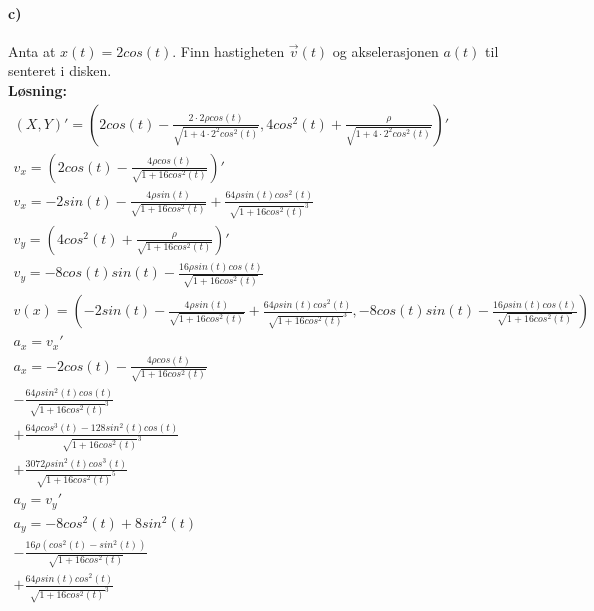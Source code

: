 \documentclass[11pt, A4paper,norsk]{article}
\begin{document}
		\paragraph{c)}
			\begin{flushleft}
Anta at $x(t) = 2 cos(t)$. Finn hastigheten $\vec{v}(t)$ og akselerasjonen $a(t)$ til senteret i disken. \\
\vspace{1mm}
\clearpage
\textbf{Løsning:} \\
\vspace{1mm}
				\begin{align}
(X, Y)' = \left(2cos(t) - \frac{2 \cdot 2 \rho cos(t)}{\sqrt{1 + 4 \cdot 2^2 cos^2(t)}}, 4cos^2(t) + \frac{\rho}{\sqrt{1 + 4 \cdot 2^2 cos^2(t)}}\right)' \nonumber \\
v_x = \left(2cos(t) - \frac{4 \rho cos(t)}{\sqrt{1 + 16cos^2(t)}}\right)' \nonumber\\
v_x = -2sin(t) -  \frac{4 \rho sin(t)}{\sqrt{1 + 16cos^2(t)}} + \frac{64 \rho sin(t)cos^2(t)}{\sqrt{1 + 16cos^2(t)}^3}\nonumber \\
v_y = \left(4cos^2(t) + \frac{\rho}{\sqrt{1 + 16cos^2(t)}}\right)' \nonumber \\
v_y = -8cos(t)sin(t) - \frac{16 \rho sin(t)cos(t)}{\sqrt{1 + 16cos^2(t)}} \nonumber \\
v(x) = \left(-2sin(t) -  \frac{4 \rho sin(t)}{\sqrt{1 + 16cos^2(t)}} + \frac{64 \rho sin(t)cos^2(t)}{\sqrt{1 + 16cos^2(t)}^3}, -8cos(t)sin(t) - \frac{16 \rho sin(t)cos(t)}{\sqrt{1 + 16cos^2(t)}}\right) \nonumber \\
a_x = v_x' \nonumber \\
a_x = -2cos(t) - \frac{4 \rho cos(t)}{\sqrt{1 + 16cos^2(t)}} \nonumber \\
- \frac{64 \rho sin^2(t)cos(t)}{\sqrt{1 + 16cos^2(t)}^3} \nonumber \\
+ \frac{64 \rho cos^3(t) \nonumber - 128sin^2(t)cos(t)}{\sqrt{1 + 16cos^2(t)}^3} \nonumber \\
+ \frac{3072 \rho sin^2(t)cos^3(t)}{\sqrt{1 + 16cos^2(t)}^5} \nonumber \\
a_y = v_y' \nonumber \\
a_y = -8cos^2(t) + 8sin^2(t) \nonumber \\
- \frac{16 \rho (cos^2(t) - sin^2(t))}{\sqrt{1 + 16cos^2(t)}} \nonumber \\
+ \frac{64 \rho sin(t)cos^2(t)}{\sqrt{1 + 16cos^2(t)}^3} \nonumber
				\end{align}
\vspace{1mm}
			\end{flushleft}
\end{document}
